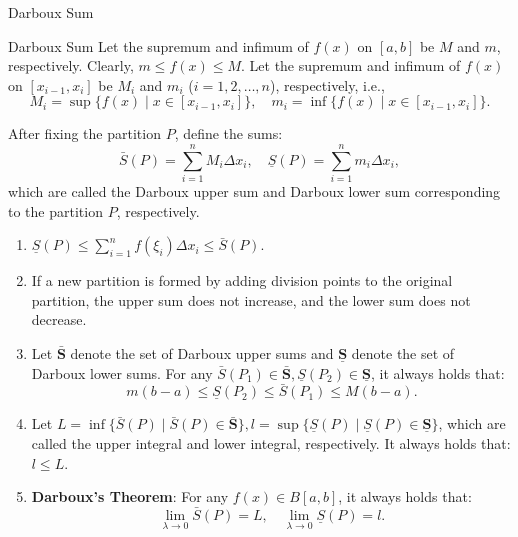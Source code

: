 \documentclass[11pt]{../../TexTemplate/elegantbook}
\begin{document}
\begin{leftbarTitle}{Darboux Sum}\end{leftbarTitle}
\begin{definition}{Darboux Sum}
    Let the supremum and infimum of \( f(x) \) on \( [a, b] \) be \( M \) and \( m \), respectively. 
    Clearly, \( m \leqslant f(x) \leqslant M \).
    Let the supremum and infimum of \( f(x) \) on \( [x_{i-1}, x_i] \) 
    be \( M_i \) and \( m_i \) (\( i = 1, 2, \dots, n \)), respectively, i.e.,  
    \[
    M_i = \sup\{ f(x) \mid x \in [x_{i-1}, x_i] \}, \quad m_i = \inf\{ f(x) \mid x \in [x_{i-1}, x_i] \}.
    \]

    After fixing the partition \( P \), define the sums:  
    \[
    \bar{S}(P) = \sum_{i=1}^n M_i \Delta x_i, \quad \underline{S}(P) = \sum_{i=1}^n m_i \Delta x_i,
    \]  
    which are called the Darboux upper sum and Darboux lower sum corresponding to the partition \( P \), respectively.
\end{definition}

\begin{property}
    \begin{enumerate}
    \item \( \underline{S}(P) \leqslant \sum_{i=1}^n f(\xi_i) \Delta x_i \leqslant \bar{S}(P) \).
    \item If a new partition is formed by adding division points to the original partition, 
        the upper sum does not increase, and the lower sum does not decrease.
    \item Let \( \boldsymbol{\bar{S}} \) denote the set of Darboux upper sums 
        and \( \boldsymbol{\underline{S}} \) denote the set of Darboux lower sums. 
        For any \( \bar{S}(P_1) \in \boldsymbol{\bar{S}}, \underline{S}(P_2) \in \boldsymbol{\underline{S}} \), 
        it always holds that:  
        \[
        m(b-a) \leqslant \underline{S}(P_2) \leqslant \bar{S}(P_1) \leqslant M(b-a).
        \]
    \item Let \( L = \inf\{ \bar{S}(P) \mid \bar{S}(P) \in \boldsymbol{\bar{S}} \}, l = \sup\{ \underline{S}(P) \mid \underline{S}(P) \in \boldsymbol{\underline{S}} \} \), which are called the upper integral and lower integral, respectively. It always holds that: \( l \leqslant L \).
    \item \textbf{Darboux's Theorem}: For any \( f(x) \in B[a, b] \), it always holds that:  
        \[
        \lim_{\lambda \to 0} \bar{S}(P) = L, \quad \lim_{\lambda \to 0} \underline{S}(P) = l.
        \]
\end{enumerate}
\end{property}
\end{document}
